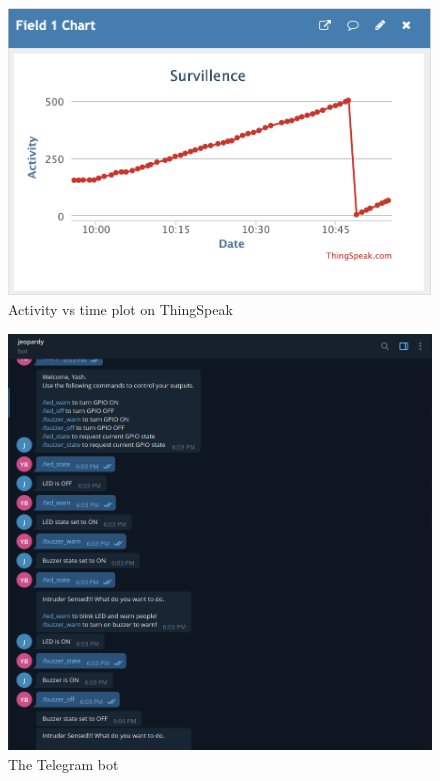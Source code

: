 \documentclass[12pt, a4paper]{article}
\theoremstyle{definition}
\theoremstyle{remark}
\begin{document}
\begin{figure}[!t]
    \centering
    \includegraphics[scale=0.6]{img/ThingSpeak Chart.png}
    \caption{Activity vs time plot on ThingSpeak}
    \label{fig:TS}
\end{figure}

\begin{figure}[!h]
    \centering
    \includegraphics*[scale=0.5]{img/Telegram Bot.png}
    \caption{The Telegram bot}
    \label{fig:TB}
\end{figure}
\end{document}
